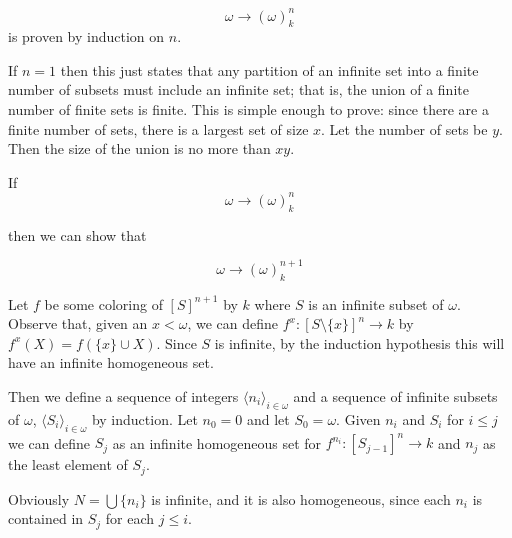 \documentclass[12pt]{article}
\begin{document}

$$\omega\rightarrow(\omega)^n_k$$
is proven by induction on $n$.

If $n=1$ then this just states that any partition of an infinite set into a finite number of subsets must include an infinite set; that is, the union of a finite number of finite sets is finite.  This is simple enough to prove: since there are a finite number of sets, there is a largest set of size $x$.  Let the number of sets be $y$.  Then the size of the union is no more than $xy$.

If
$$\omega\rightarrow(\omega)^n_k$$

then we can show that 

$$\omega\rightarrow(\omega)^{n+1}_k$$

Let $f$ be some coloring of $[S]^{n+1}$ by $k$ where $S$ is an infinite subset of $\omega$.  Observe that, given an $x<\omega$, we can define $f^x\colon[S\setminus\{x\}]^{n}\rightarrow k$ by $f^x(X)=f(\{x\}\cup X)$.  Since $S$ is infinite, by the induction hypothesis this will have an infinite homogeneous set.

Then we define a sequence of integers $\langle n_i\rangle_{i\in\omega}$ and a sequence of infinite subsets of $\omega$, $\langle S_i\rangle_{i\in\omega}$ by induction.  Let $n_0=0$ and let $S_0=\omega$.  Given $n_i$ and $S_i$ for $i\leq j$ we can define $S_{j}$ as an infinite homogeneous set for $f^{n_i}\colon[S_{j-1}]^n\rightarrow k$ and $n_j$ as the least element of $S_j$.

Obviously $N=\bigcup \{n_i\}$ is infinite, and it is also homogeneous, since each $n_i$ is contained in $S_j$ for each $j\leq i$.
\end{document}
